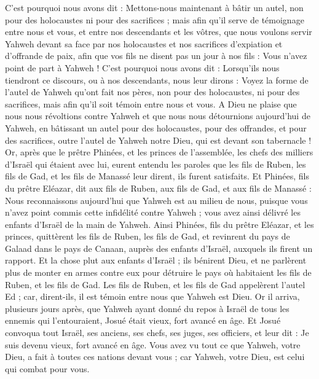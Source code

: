 \begin{multicols}{2}
C'est pourquoi nous avons dit : Mettons-nous maintenant à bâtir un autel, non pour des holocaustes ni pour des sacrifices ;
mais afin qu'il serve de témoignage entre nous et vous, et entre nos descendants et les vôtres, que nous voulons servir Yahweh devant sa face par nos holocaustes et nos sacrifices d'expiation et d'offrande de paix, afin que vos fils ne disent pas un jour à nos fils : Vous n'avez point de part à Yahweh !
C'est pourquoi nous avons dit : Lorsqu'ils nous tiendront ce discours, ou à nos descendants, nous leur dirons : Voyez la forme de l'autel de Yahweh qu'ont fait nos pères, non pour des holocaustes, ni pour des sacrifices, mais afin qu'il soit témoin entre nous et vous.
A Dieu ne plaise que nous nous révoltions contre Yahweh et que nous nous détournions aujourd'hui de Yahweh, en bâtissant un autel pour des holocaustes, pour des offrandes, et pour des sacrifices, outre l'autel de Yahweh notre Dieu, qui est devant son tabernacle !
Or, après que le prêtre Phinées, et les princes de l'assemblée, les chefs des milliers d'Israël qui étaient avec lui, eurent entendu les paroles que les fils de Ruben, les fils de Gad, et les fils de Manassé leur dirent, ils furent satisfaits.
Et Phinées, fils du prêtre Eléazar, dit aux fils de Ruben, aux fils de Gad, et aux fils de Manassé : Nous reconnaissons aujourd'hui que Yahweh est au milieu de nous, puisque vous n'avez point commis cette infidélité contre Yahweh ; vous avez ainsi délivré les enfants d'Israël de la main de Yahweh.
Ainsi Phinées, fils du prêtre Eléazar, et les princes, quittèrent les fils de Ruben, les fils de Gad, et revinrent du pays de Galaad dans le pays de Canaan, auprès des enfants d'Israël, auxquels ils firent un rapport.
Et la chose plut aux enfants d'Israël ; ils bénirent Dieu, et ne parlèrent plus de monter en armes contre eux pour détruire le pays où habitaient les fils de Ruben, et les fils de Gad.
Les fils de Ruben, et les fils de Gad appelèrent l'autel Ed ; car, dirent-ils, il est témoin entre nous que Yahweh est Dieu.
\VerseOne{}Or il arriva, plusieurs jours après, que Yahweh ayant donné du repos à Israël de tous les ennemis qui l'entouraient, Josué était vieux, fort avancé en âge.
Et Josué convoqua tout Israël, ses anciens, ses chefs, ses juges, ses officiers, et leur dit : Je suis devenu vieux, fort avancé en âge.
Vous avez vu tout ce que Yahweh, votre Dieu, a fait à toutes ces nations devant vous ; car Yahweh, votre Dieu, est celui qui combat pour vous.

\end{multicols}
